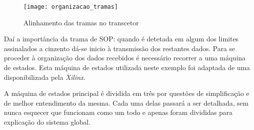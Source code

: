\begin{figure}[h!]
		\begin{center}
		\leavevmode
		\texttt{[image: organizacao\_tramas]}
		\captionsetup{width=1.0\linewidth}
		\caption[Alinhamento das tramas no transcetor]{Alinhamento das tramas no transcetor}
		\label{fig:alinhamento_tramas_gtx}
	\end{center}
\end{figure}

Daí a importância da trama de SOP: quando é detetada em algum dos limites assinalados a cinzento dá-se inicio à transmissão dos restantes dados. Para se proceder à organização dos dados recebidos é necessário recorrer a uma máquina de estados. Esta máquina de estados utilizada neste exemplo foi adaptada de uma disponibilizada pela \textit{Xilinx}.

A máquina de estados principal é dividida em três por questões de simplificação e de melhor entendimento da mesma. Cada uma delas passará a ser detalhada, sem nunca esquecer que funcionam como um todo e apenas foram divididas para explicação do sistema global.

